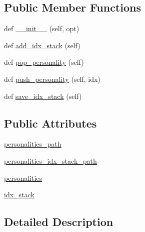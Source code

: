 \subsection*{Public Member Functions}
\begin{DoxyCompactItemize}
\item 
def \hyperlink{classpersonality__captions_1_1worlds_1_1PersonalityGenerator_a9964a939fc695387f9f3f4d30b8cea0f}{\+\_\+\+\_\+init\+\_\+\+\_\+} (self, opt)
\item 
def \hyperlink{classpersonality__captions_1_1worlds_1_1PersonalityGenerator_a78cf1854a907766176bd595a66e0b4c1}{add\+\_\+idx\+\_\+stack} (self)
\item 
def \hyperlink{classpersonality__captions_1_1worlds_1_1PersonalityGenerator_a5d77b6f2855f26f68832d81f4b84ba99}{pop\+\_\+personality} (self)
\item 
def \hyperlink{classpersonality__captions_1_1worlds_1_1PersonalityGenerator_a1a7e9fddde73adcfaf1fa9c82ae5a732}{push\+\_\+personality} (self, idx)
\item 
def \hyperlink{classpersonality__captions_1_1worlds_1_1PersonalityGenerator_a6234b41cdaf670fa367723cce5a47b8b}{save\+\_\+idx\+\_\+stack} (self)
\end{DoxyCompactItemize}
\subsection*{Public Attributes}
\begin{DoxyCompactItemize}
\item 
\hyperlink{classpersonality__captions_1_1worlds_1_1PersonalityGenerator_aab870fd5462e825716eb0e2a996671e2}{personalities\+\_\+path}
\item 
\hyperlink{classpersonality__captions_1_1worlds_1_1PersonalityGenerator_ad1e7cbf0a184bb37c8f5220218cbb524}{personalities\+\_\+idx\+\_\+stack\+\_\+path}
\item 
\hyperlink{classpersonality__captions_1_1worlds_1_1PersonalityGenerator_ad2e42bbbde55a18a9c10477bc5ac4b02}{personalities}
\item 
\hyperlink{classpersonality__captions_1_1worlds_1_1PersonalityGenerator_a75a92b71d3b65ebf571421dfc18d8d0c}{idx\+\_\+stack}
\end{DoxyCompactItemize}


\subsection{Detailed Description}


